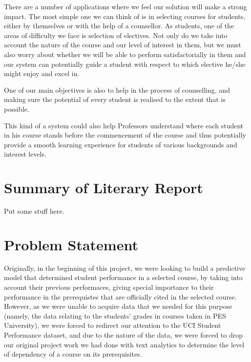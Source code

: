\documentclass[conference]{IEEEtran}
\begin{document}
There are a number of applications where we feel our solution will make a strong impact. The most simple one we can think of is in selecting courses for students, either by themselves or with the help of a counsellor. As students, one of the areas of difficulty we face is selection of electives. Not only do we take into account the nature of the course and our level of interest in them, but we must also worry about whether we will be able to perform satisfactorially in them and our system can potentially guide a student with respect to which elective he/she might enjoy and excel in.

One of our main objectives is also to help in the process of counselling, and making sure the potential of every student is realised to the extent that is possible. 

This kind of a system could also help Professors understand where each student in his course stands before the commencement of the course and thus potentially provide a smooth learning experience for students of various backgrounds and interest levels.


	\section{Summary of Literary Report}

Put some stuff here.

	\section{Problem Statement}
Originally, in the beginning of this project, we were looking to build a predictive model that determined student performance in a selected course, by taking into account their previous performaces, giving special importance to their performance in the prerequistes that are officially cited in the selected course. However, as we were unable to acquire data that we needed for this purpose (namely, the data relating to the students' grades in courses taken in PES University), we were forced to redirect our attention to the UCI Student Performance dataset\cite{Lichman:2013}\cite{ref:4}, and due to the nature of the data, we were forced to drop our original project work we had done with text analytics to determine the level of dependency of a course on its prerequisites.
\end{document}

